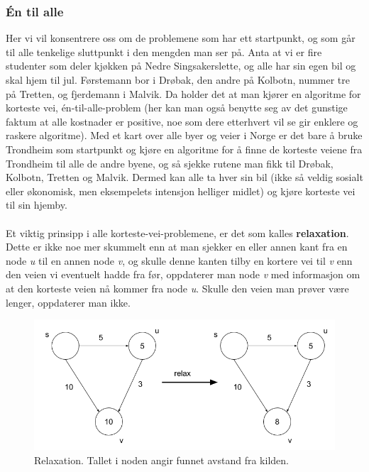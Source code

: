 \subsubsection{Én til alle}
Her vi vil konsentrere oss om de problemene som har ett startpunkt, og som går til alle tenkelige sluttpunkt i den mengden man ser på. Anta at vi er fire studenter som deler kjøkken på Nedre Singsakerslette, og alle har sin egen bil og skal hjem til jul. Førstemann bor i Drøbak, den andre på Kolbotn, nummer tre på Tretten, og fjerdemann i Malvik. Da holder det at man kjører en algoritme for korteste vei, én-til-alle-problem (her kan man også benytte seg av det gunstige faktum at alle kostnader er positive, noe som dere etterhvert vil se gir enklere og raskere algoritme). Med et kart over alle byer og veier i Norge er det bare å bruke Trondheim som startpunkt og kjøre en algoritme for å finne de korteste veiene fra Trondheim til alle de andre byene, og så sjekke rutene man fikk til Drøbak, Kolbotn, Tretten og Malvik. Dermed kan alle ta hver sin bil (ikke så veldig sosialt eller økonomisk, men eksempelets intensjon helliger midlet) og kjøre korteste vei til sin hjemby. 
\\\\
Et viktig prinsipp i alle korteste-vei-problemene, er det som kalles \textbf{relaxation}. Dette er ikke noe mer skummelt enn at man sjekker en eller annen kant fra en node \textit{u} til en annen node \textit{v}, og skulle denne kanten tilby en kortere vei til \textit{v} enn den veien vi eventuelt hadde fra før, oppdaterer man node \textit{v} med informasjon om at den korteste veien nå kommer fra node \textit{u}. Skulle den veien man prøver være lenger, oppdaterer man ikke.

\begin{figure}[H]
\includegraphics[scale=0.5]{images/relaxation}
\centering %
\caption{Relaxation. Tallet i noden angir funnet avstand fra kilden.}
\label{fig:relaxation}
\end{figure}

